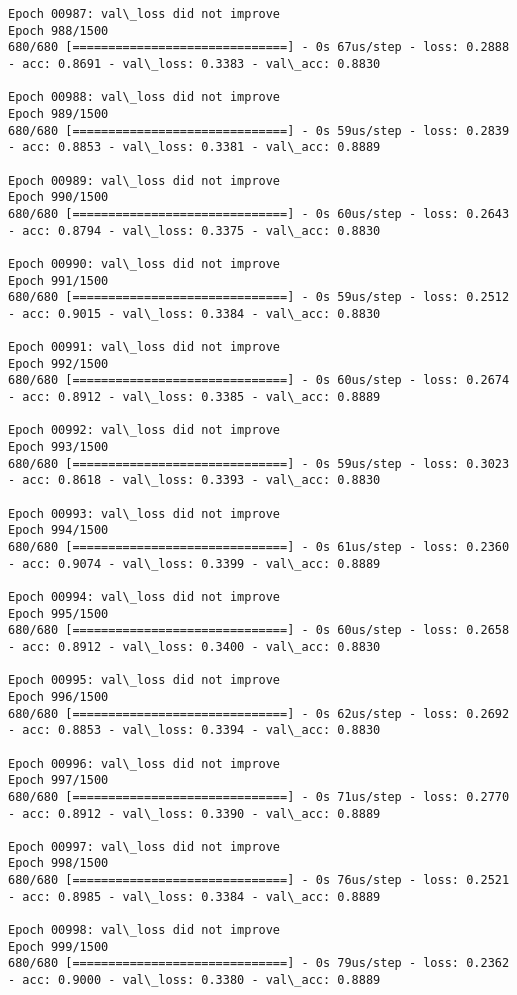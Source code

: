 \documentclass[11pt]{article}
\begin{document}
\begin{Verbatim}[commandchars=\\\{\}]
Epoch 00987: val\_loss did not improve
Epoch 988/1500
680/680 [==============================] - 0s 67us/step - loss: 0.2888 - acc: 0.8691 - val\_loss: 0.3383 - val\_acc: 0.8830

Epoch 00988: val\_loss did not improve
Epoch 989/1500
680/680 [==============================] - 0s 59us/step - loss: 0.2839 - acc: 0.8853 - val\_loss: 0.3381 - val\_acc: 0.8889

Epoch 00989: val\_loss did not improve
Epoch 990/1500
680/680 [==============================] - 0s 60us/step - loss: 0.2643 - acc: 0.8794 - val\_loss: 0.3375 - val\_acc: 0.8830

Epoch 00990: val\_loss did not improve
Epoch 991/1500
680/680 [==============================] - 0s 59us/step - loss: 0.2512 - acc: 0.9015 - val\_loss: 0.3384 - val\_acc: 0.8830

Epoch 00991: val\_loss did not improve
Epoch 992/1500
680/680 [==============================] - 0s 60us/step - loss: 0.2674 - acc: 0.8912 - val\_loss: 0.3385 - val\_acc: 0.8889

Epoch 00992: val\_loss did not improve
Epoch 993/1500
680/680 [==============================] - 0s 59us/step - loss: 0.3023 - acc: 0.8618 - val\_loss: 0.3393 - val\_acc: 0.8830

Epoch 00993: val\_loss did not improve
Epoch 994/1500
680/680 [==============================] - 0s 61us/step - loss: 0.2360 - acc: 0.9074 - val\_loss: 0.3399 - val\_acc: 0.8889

Epoch 00994: val\_loss did not improve
Epoch 995/1500
680/680 [==============================] - 0s 60us/step - loss: 0.2658 - acc: 0.8912 - val\_loss: 0.3400 - val\_acc: 0.8830

Epoch 00995: val\_loss did not improve
Epoch 996/1500
680/680 [==============================] - 0s 62us/step - loss: 0.2692 - acc: 0.8853 - val\_loss: 0.3394 - val\_acc: 0.8830

Epoch 00996: val\_loss did not improve
Epoch 997/1500
680/680 [==============================] - 0s 71us/step - loss: 0.2770 - acc: 0.8912 - val\_loss: 0.3390 - val\_acc: 0.8889

Epoch 00997: val\_loss did not improve
Epoch 998/1500
680/680 [==============================] - 0s 76us/step - loss: 0.2521 - acc: 0.8985 - val\_loss: 0.3384 - val\_acc: 0.8889

Epoch 00998: val\_loss did not improve
Epoch 999/1500
680/680 [==============================] - 0s 79us/step - loss: 0.2362 - acc: 0.9000 - val\_loss: 0.3380 - val\_acc: 0.8889


\end{Verbatim}
\end{document}
